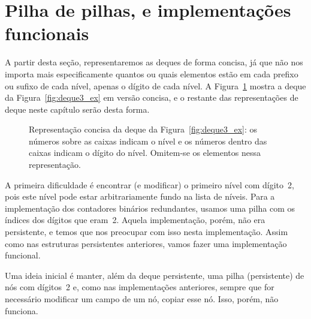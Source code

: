 \documentclass[../../main.tex]{subfiles}
\begin{document}
\section{Pilha de pilhas, e implementações funcionais} \label{sec:implfunc}

A partir desta seção, representaremos as deques de forma concisa, já que não nos importa mais especificamente quantos ou quais elementos estão em cada prefixo ou sufixo de cada nível, apenas o dígito de cada nível. A Figura~\ref{fig:deque3_ex2} mostra a deque da Figura~\ref{fig:deque3_ex} em versão concisa, e o restante das representações de deque neste capítulo serão desta forma.

\begin{figure}[h]
\centering
{}
\caption{Representação concisa da deque da Figura~\ref{fig:deque3_ex}: os números sobre as caixas indicam o nível e os números dentro das caixas indicam o dígito do nível. Omitem-se os elementos nessa representação.} \label{fig:deque3_ex2}
\end{figure}

A primeira dificuldade é encontrar (e modificar) o primeiro nível com dígito~2, pois este nível pode estar arbitrariamente fundo na lista de níveis. Para a implementação dos contadores binários redundantes, usamos uma pilha com os índices dos dígitos que eram~2. Aquela implementação, porém, não era persistente, e temos que nos preocupar com isso nesta implementação. Assim como nas estruturas persistentes anteriores, vamos fazer uma implementação funcional.

Uma ideia inicial é manter, além da deque persistente, uma pilha (persistente) de nós com dígitos~2 e, como nas implementações anteriores, sempre que for necessário modificar um campo de um nó, copiar esse nó. Isso, porém, não funciona.

\end{document}
